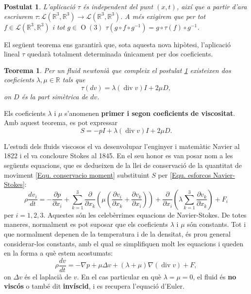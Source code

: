 \documentclass{article}
\numberwithin{equation}{section}
\DeclareMathOperator{\diver}{div}
\DeclareMathOperator{\Or}{O}
\newtheorem{teorema}{Teorema}[section]
\newtheorem{postulat}{Postulat}[section]
\begin{document}
\begin{postulat}\label{Pos: isotrop homogeni}
L'aplicaci\'{o} $\tau$ \'{e}s independent del punt $(x,t)$, aix\'{i} que a partir d'ara escriurem $\tau:\mathcal{L}(\mathbb{R}^3,\mathbb{R}^3)\rightarrow\mathcal{L}(\mathbb{R}^3,\mathbb{R}^3)$. A m\'{e}s exigirem que per tot $f\in\mathcal{L}(\mathbb{R}^3,\mathbb{R}^3)$ i tot $g\in\Or(3)$ $\tau(g\circ f\circ g^{-1})=g\circ\tau(f)\circ g^{-1}$.
\end{postulat}

El seg\"{u}ent teorema ens garantir\`{a} que, sota aquesta nova hip\`{o}tesi, l'aplicaci\'{o} lineal $\tau$ quedar\`{a} totalment determinada \'{u}nicament per dos coeficients.

\begin{teorema}
Per un fluid newtoni\`{a} que compleix el postulat \ref{Pos: isotrop homogeni} existeixen dos coeficients $\lambda,\mu\in\mathbb{R}$ tals que
\[\tau(dv)=\lambda(\diver v)I+2\mu D,\]
on $D$ \'{e}s la part sim\`{e}trica de $dv$.
\end{teorema}

Els coeficients $\lambda$ i $\mu$ s'anomenen \textbf{primer i segon coeficients de viscositat}. Amb aquest teorema, es pot expressar
\begin{equation}\label{Equ. esforcos Navier-Stokes}
S=-pI+\lambda(\diver v)I+2\mu D.
\end{equation}

L'estudi dels fluids viscosos el va desenvolupar l'enginyer i matem\`{a}tic Navier al 1822 i el va concloure Stokes al 1845. En el seu honor es van posar nom a les seg\"{u}ents equacions, que es dedueixen de la llei de conservaci\'{o} de la quantitat de moviment \eqref{Equ. conservacio moment} substituint $S$ per \eqref{Equ. esforcos Navier-Stokes}:
\begin{equation}
\rho\frac{dv_i}{dt}=-\frac{\partial p}{\partial x_i}+\sum_{k=1}^3\frac{\partial}{\partial x_k}\left(\mu\left(\frac{\partial v_i}{\partial x_k}+\frac{\partial v_k}{\partial x_i}\right)\right)+\frac{\partial}{\partial x_i}\left(\lambda\sum_{k=1}^3\frac{\partial v_k}{\partial x_k}\right)+F_i
\end{equation}
per $i=1,2,3$. Aquestes s\'{o}n les celeb\`{e}rrimes equacions de Navier-Stokes. De totes maneres, normalment es pot suposar que els coeficients $\lambda$ i $\mu$ s\'{o}n constants. Tot i que normalment depenen de la temperatura i de la densitat, \'{e}s prou general considerar-los constants, amb el qual se simplifiquen molt les equacions i queden en la forma a qu\`{e} estem acostumats:
\begin{equation}
\rho\frac{dv}{dt}=-\nabla p+\mu\Delta v+(\lambda+\mu)\nabla(\diver v)+F,
\end{equation}
on $\Delta v$ \'{e}s el laplaci\`{a} de $v$. En el cas particular en qu\`{e} $\lambda=\mu=0$, el fluid \'{e}s \textbf{no visc\'{o}s} o tamb\'{e} dit \textbf{inv\'{i}scid}, i es recupera l'equaci\'{o} d'Euler.
\end{document}
